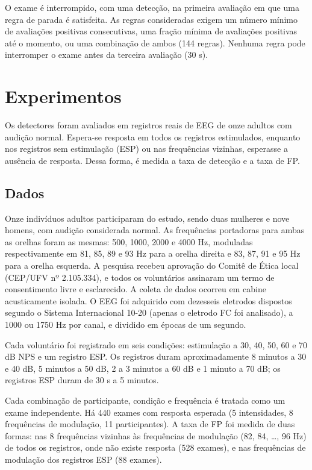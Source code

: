 \documentclass[conference]{IEEEtran}
\begin{document}
O exame é interrompido, com uma detecção, na primeira avaliação em que uma regra de parada é satisfeita. As regras consideradas exigem um número mínimo de avaliações positivas consecutivas, uma fração mínima de avaliações positivas até o momento, ou uma combinação de ambos (144 regras). Nenhuma regra pode interromper o exame antes da terceira avaliação (30 s).

\section{Experimentos}

Os detectores foram avaliados em registros reais de EEG de onze adultos com audição normal. Espera-se resposta em todos os registros estimulados, enquanto nos registros sem estimulação  (ESP) ou nas frequências vizinhas, esperasse a ausência de resposta. Dessa forma, é medida a taxa de detecção e a taxa de FP.

\subsection{Dados}

Onze indivíduos adultos participaram do estudo, sendo duas mulheres e nove homens, com audição considerada normal. As frequências portadoras para ambas as orelhas foram as mesmas: 500, 1000, 2000 e 4000 Hz, moduladas respectivamente em 81, 85, 89 e 93 Hz para a orelha direita e 83, 87, 91 e 95 Hz para a orelha esquerda. A pesquisa recebeu aprovação do Comitê de Ética local (CEP/UFV nº 2.105.334), e todos os voluntários assinaram um termo de consentimento livre e esclarecido. A coleta de dados ocorreu em cabine acusticamente isolada. O EEG foi adquirido com dezesseis eletrodos dispostos segundo o Sistema Internacional 10-20 (apenas o eletrodo FC foi analisado), a 1000 ou 1750 Hz por canal, e dividido em épocas de um segundo.

Cada voluntário foi registrado em seis condições: estimulação a 30, 40, 50, 60 e 70 dB NPS e um registro ESP. Os registros duram aproximadamente 8 minutos a 30 e 40 dB, 5 minutos a 50 dB, 2 a 3 minutos a 60 dB e 1 minuto a 70 dB; os registros ESP duram de 30 s a 5 minutos.

Cada combinação de participante, condição e frequência é tratada como um exame independente. Há 440 exames com resposta esperada (5 intensidades, 8 frequências de modulação, 11 participantes). A taxa de FP foi medida de duas formas: nas 8 frequências vizinhas às frequências de modulação (82, 84, \ldots, 96 Hz) de todos os registros, onde não existe resposta (528 exames), e nas frequências de modulação dos registros ESP (88 exames).
\end{document}
